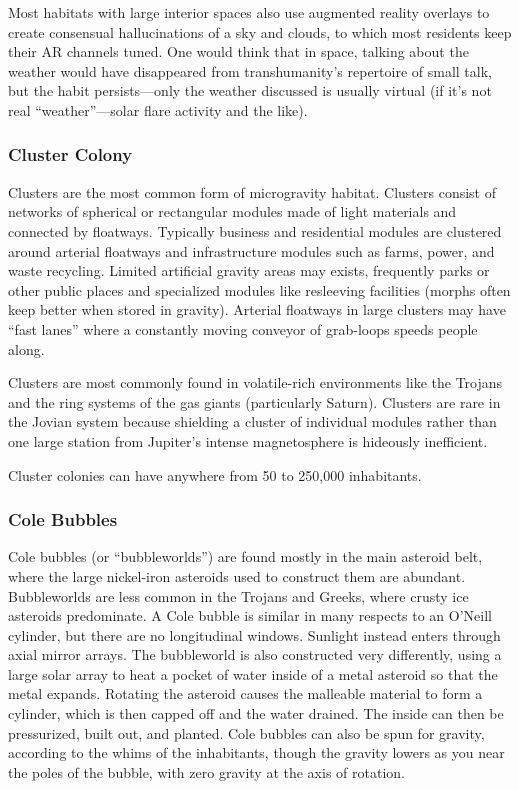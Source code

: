 Most habitats with large interior spaces also use augmented
reality overlays to create consensual hallucinations
of a sky and clouds, to which most residents keep
their AR channels tuned. One would think that in space, 
talking about the weather would have disappeared from 
transhumanity's repertoire of small talk, but the habit 
persists—only the weather discussed is usually virtual (if 
it's not real ``weather''—solar flare activity and the like).

\subsubsection{Cluster Colony}

Clusters are the most common form of microgravity 
habitat. Clusters consist of networks of spherical or 
rectangular modules made of light materials and connected
by floatways. Typically business and residential
modules are clustered around arterial floatways and infrastructure
modules such as farms, power, and waste
recycling. Limited artificial gravity areas may exists, 
frequently parks or other public places and specialized 
modules like resleeving facilities (morphs often keep 
better when stored in gravity). Arterial floatways in 
large clusters may have ``fast lanes'' where a constantly 
moving conveyor of grab-loops speeds people along.

Clusters are most commonly found in volatile-rich environments 
like the Trojans and the ring systems of the gas giants (particularly 
Saturn). Clusters are rare in the Jovian system because shielding a 
cluster of individual modules rather than one large station from 
Jupiter's intense magnetosphere is hideously inefficient.

Cluster colonies can have anywhere from 50 to 250,000 inhabitants.

\subsubsection{Cole Bubbles}

Cole bubbles (or ``bubbleworlds'') are found mostly in the main 
asteroid belt, where the large nickel-iron asteroids used to construct 
them are abundant. Bubbleworlds are less common in the Trojans 
and Greeks, where crusty ice asteroids predominate. A Cole bubble 
is similar in many respects to an O'Neill cylinder, but there are no 
longitudinal windows. Sunlight instead enters through axial mirror 
arrays. The bubbleworld is also constructed very differently, using a 
large solar array to heat a pocket of water inside of a metal asteroid 
so that the metal expands. Rotating the asteroid causes the malleable
material to form a cylinder, which is then capped off and the
water drained. The inside can then be pressurized, built out, and 
planted. Cole bubbles can also be spun for gravity, according to the 
whims of the inhabitants, though the gravity lowers as you near the 
poles of the bubble, with zero gravity at the axis of rotation.

